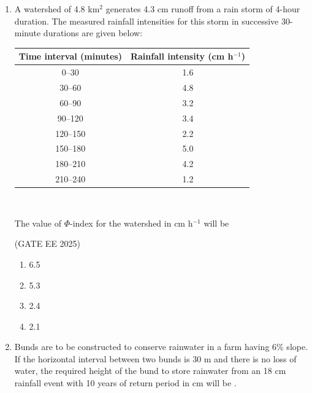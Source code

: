 \documentclass[journal,12pt,onecolumn]{IEEEtran}
\theoremstyle{remark}
\begin{document}
\begin{enumerate}
\hfill(GATE EE 2025)

\begin{multicols}{4}
\begin{enumerate}
    \item 5 cm; 10 days
    \item 10 cm; 7 days
    \item 8 cm; 12 days
    \item 4 cm; 8 days
\end{enumerate}
\end{multicols}

\item A watershed of 4.8 km$^2$ generates 4.3 cm runoff from a rain storm of 4-hour duration. The measured rainfall intensities for this storm in successive 30-minute durations are given below: 
\begin{center}
\begin{tabular}{|c|c|}
\hline
Time interval (minutes) & Rainfall intensity (cm h$^{-1}$) \\
\hline
0--30 & 1.6 \\
\hline
30--60 & 4.8 \\
\hline
60--90 & 3.2 \\
\hline
90--120 & 3.4 \\
\hline
120--150 & 2.2 \\
\hline
150--180 & 5.0 \\
\hline
180--210 & 4.2 \\
\hline
210--240 & 1.2 \\
\hline
\end{tabular} \\[6pt]
\end{center}
The value of $\Phi$-index for the watershed in cm h$^{-1}$ will be

\hfill(GATE EE 2025)

\begin{multicols}{4}
\begin{enumerate}
    \item 6.5
    \item 5.3
    \item 2.4
    \item 2.1
\end{enumerate}
\end{multicols}

\item Bunds are to be constructed to conserve rainwater in a farm having 6\% slope. If the horizontal interval between two bunds is 30 m and there is no loss of water, the required height of the bund to store rainwater from an 18 cm rainfall event with 10 years of return period in cm will be \underline{\hspace{2cm}}. 


\end{enumerate}
\end{document}
